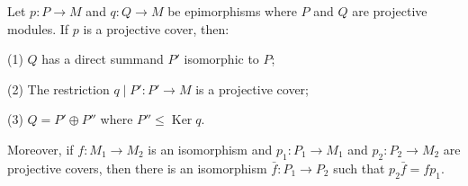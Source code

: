 Let $p: P \to M$ and $q: Q \to M$ be epimorphisms where $P$ and $Q$ are projective modules. If $p$ is a projective cover, then:

(1) $Q$ has a direct summand $P'$ isomorphic to $P$;

(2) The restriction $q \mid P' : P' \to M$ is a projective cover;

(3) $Q = P' \oplus P''$ where $P'' \leq \operatorname{Ker} q$.

Moreover, if $f: M_1 \to M_2$ is an isomorphism and $p_1: P_1 \to M_1$ and $p_2: P_2 \to M_2$ are projective covers, then there is an isomorphism $\bar{f}: P_1 \to P_2$ such that $p_2 \bar{f} = f p_1$.
